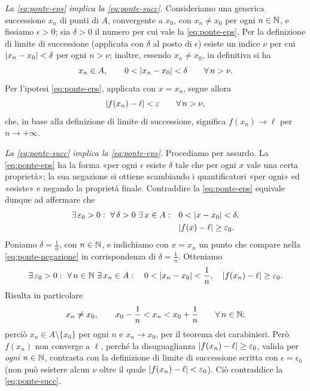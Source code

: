\begin{dimostrazione}
\emph{La \eqref{eq:ponte-eps} implica la \eqref{eq:ponte-succ}.} Consideriamo una
generica successione $x_{n}$ di punti di $A$, convergente a $x_{0}$, con $x_{n}\neq x_{0}$
per ogni $n\in\mathbb{N}$, e fissiamo $\epsilon>0$; sia $\delta>0$ il numero per cui vale la
\eqref{eq:ponte-eps}. Per la definizione di limite di successione (applicata con $\delta$
al posto di $\epsilon$) esiste un indice $\nu$ per cui $\lvert x_{n}-x_{0}\rvert<\delta$ per ogni
$n>\nu$; inoltre, essendo $x_{n}\neq x_{0}$, in definitiva si ha
\begin{equation}\label{eq:ponte-passo1}
  x_{n}\in A, \qquad 0<\lvert x_{n}-x_{0}\rvert<\delta \qquad\forall\, n>\nu .
\end{equation}
Per l'ipotesi \eqref{eq:ponte-eps}, applicata con $x=x_{n}$, segue allora
\begin{equation}\label{eq:ponte-passo2}
  \lvert f(x_{n})-\ell\rvert<\varepsilon \qquad\forall\, n>\nu,
\end{equation}
che, in base alla definizione di limite di successione, significa $f(x_{n})\to\ell$ per
$n\to+\infty$.

\emph{La \eqref{eq:ponte-succ} implica la \eqref{eq:ponte-eps}.} Procediamo per assurdo.
La \eqref{eq:ponte-eps} ha la forma «per ogni $\epsilon$ esiste $\delta$ tale che per
ogni $x$ vale una certa proprietà»; la sua negazione si ottiene scambiando i
quantificatori «per ogni» ed «esiste» e negando la proprietà finale. Contraddire la
\eqref{eq:ponte-eps} equivale dunque ad affermare che
\begin{equation}\label{eq:ponte-negazione}
\begin{split}
  \exists\,\varepsilon_{0}>0 :\ \forall\,\delta>0\ \exists\, x\in A :\quad &0<\lvert x-x_{0}\rvert<\delta,\\
  &\lvert f(x)-\ell\rvert\ge\varepsilon_{0} .
\end{split}
\end{equation}
Poniamo $\delta=\frac1n$, con $n\in\mathbb{N}$, e indichiamo con $x=x_{n}$ un punto che compare
nella \eqref{eq:ponte-negazione} in corrispondenza di $\delta=\frac1n$. Otteniamo
\begin{equation}\label{eq:ponte-succ-cattiva}
  \exists\,\varepsilon_{0}>0 :\ \forall\, n\in\mathbb{N}\ \exists\, x_{n}\in A :\quad
  0<\lvert x_{n}-x_{0}\rvert<\frac1n, \quad \lvert f(x_{n})-\ell\rvert\ge\varepsilon_{0} .
\end{equation}
Risulta in particolare
\begin{equation}\label{eq:ponte-carabinieri}
  x_{n}\neq x_{0}, \qquad x_{0}-\frac1n<x_{n}<x_{0}+\frac1n \qquad\forall\, n\in\mathbb{N};
\end{equation}
perciò $x_{n}\in A\setminus\{x_{0}\}$ per ogni $n$ e $x_{n}\to x_{0}$, per il teorema dei
carabinieri. Però $f(x_{n})$ non converge a $\ell$, perché la disuguaglianza
$\lvert f(x_{n})-\ell\rvert\ge\varepsilon_{0}$, valida per \emph{ogni} $n\in\mathbb{N}$, contrasta con la
definizione di limite di successione scritta con $\epsilon=\epsilon_{0}$ (non può
esistere alcun $\nu$ oltre il quale $\lvert f(x_{n})-\ell\rvert<\varepsilon_{0}$). Ciò contraddice
la \eqref{eq:ponte-succ}.
\end{dimostrazione}

